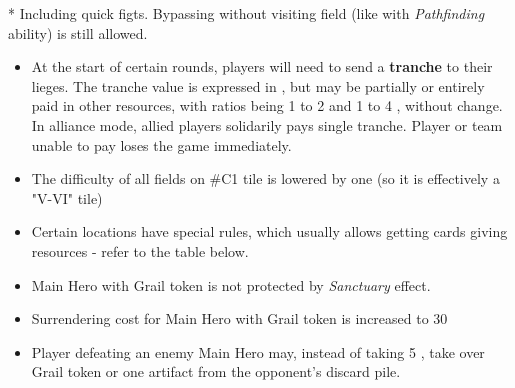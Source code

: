 \begin{multicols*}{2}
    \begin{table*}[b!]
        * Including quick figts. Bypassing without visiting field (like with \textit{Pathfinding} ability) is still allowed.
    \end{table*}

    \begin{itemize}
        \item At the start of certain rounds, players will need to send a \textbf{tranche} to their lieges. The tranche value is expressed in , but may be partially or entirely paid in other resources, with ratios being 1  to 2  and 1  to 4 , without change. In alliance mode, allied players solidarily pays single tranche. Player or team unable to pay loses the game immediately.
        \item The difficulty of all fields on \#C1 tile is lowered by one (so it is effectively a "V-VI" tile)
        \item Certain locations have special rules, which usually allows getting cards giving resources - refer to the table below.
        \item Main Hero with Grail token is not protected by \textit{Sanctuary} effect.
        \item Surrendering cost for Main Hero with Grail token is increased to 30
        \item Player defeating an enemy Main Hero may, instead of taking 5 , take over Grail token or one artifact from the opponent's discard pile.
    \end{itemize}


\end{multicols*}
